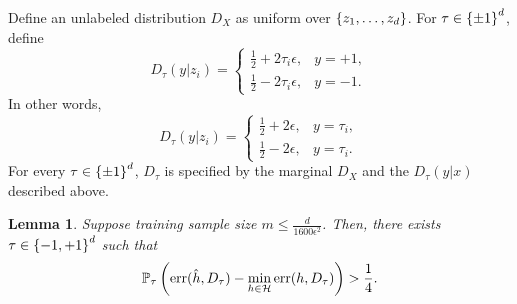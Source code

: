 \documentclass{article}
\newtheorem{lemma}{Lemma}
\DeclareMathOperator*{\err}{{\rm err}}
\newcommand{\PP}{\mathbb{P}}
\newcommand{\Hcal}{\mathcal{H}}
\begin{document}
Define an unlabeled distribution $D_X$ as uniform over $\cbr{z_1,\ldots,z_d}$. For $\tau \in \cbr{\pm 1}^d$, define
\[ D_\tau(y|z_i) = \begin{cases} \frac12 + 2 \tau_i \epsilon, & y = +1, \\ \frac12 - 2 \tau_i \epsilon, & y = -1. \end{cases} \]
In other words,
\[ D_\tau(y|z_i) = \begin{cases} \frac12 + 2\epsilon, & y = \tau_i, \\ \frac12 - 2\epsilon, & y = \tau_i. \end{cases} \]
For every $\tau \in \cbr{\pm 1}^d$, $D_\tau$ is specified by the marginal $D_X$ and the $D_\tau(y|x)$ described above.

\begin{lemma}
Suppose training sample size $m \leq \frac{d}{1600\epsilon^2}$.
Then, there exists $\tau \in \cbr{-1,+1}^d$ such that
\[ \PP_\tau\del{\err(\hat{h}, D_\tau) - \min_{h \in \Hcal} \err(h, D_\tau) } > \frac14. \]
\end{lemma}
\end{document}
